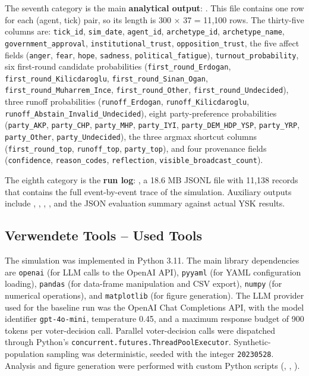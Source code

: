\documentclass[12pt,a4paper]{report}
\begin{document}
The seventh category is the main \textbf{analytical output}: . This file contains one row for each (agent, tick) pair, so its length is 300 $\times$ 37 = 11{,}100 rows. The thirty-five columns are: \texttt{tick\_id}, \texttt{sim\_date}, \texttt{agent\_id}, \texttt{archetype\_id}, \texttt{archetype\_name}, \texttt{government\_approval}, \texttt{institutional\_trust}, \texttt{opposition\_trust}, the five affect fields (\texttt{anger}, \texttt{fear}, \texttt{hope}, \texttt{sadness}, \texttt{political\_fatigue}), \texttt{turnout\_probability}, six first-round candidate probabilities (\texttt{first\_round\_Erdogan}, \texttt{first\_round\_Kilicdaroglu}, \texttt{first\_round\_Sinan\_Ogan}, \texttt{first\_round\_Muharrem\_Ince}, \texttt{first\_round\_Other}, \texttt{first\_round\_Undecided}), three runoff probabilities (\texttt{runoff\_Erdogan}, \texttt{runoff\_Kilicdaroglu}, \texttt{runoff\_Abstain\_Invalid\_Undecided}), eight party-preference probabilities (\texttt{party\_AKP}, \texttt{party\_CHP}, \texttt{party\_MHP}, \texttt{party\_IYI}, \texttt{party\_DEM\_HDP\_YSP}, \texttt{party\_YRP}, \texttt{party\_Other}, \texttt{party\_Undecided}), the three argmax shortcut columns (\texttt{first\_round\_top}, \texttt{runoff\_top}, \texttt{party\_top}), and four provenance fields (\texttt{confidence}, \texttt{reason\_codes}, \texttt{reflection}, \texttt{visible\_broadcast\_count}).

The eighth category is the \textbf{run log}: , a 18.6 MB JSONL file with 11{,}138 records that contains the full event-by-event trace of the simulation. Auxiliary outputs include , , , , and the JSON evaluation summary against actual YSK results.

\subsection{Verwendete Tools -- Used Tools}
\label{sec:tools}

The simulation was implemented in Python 3.11. The main library dependencies are \texttt{openai} (for LLM calls to the OpenAI API), \texttt{pyyaml} (for YAML configuration loading), \texttt{pandas} (for data-frame manipulation and CSV export), \texttt{numpy} (for numerical operations), and \texttt{matplotlib} (for figure generation). The LLM provider used for the baseline run was the OpenAI Chat Completions API, with the model identifier \texttt{gpt-4o-mini}, temperature 0.45, and a maximum response budget of 900 tokens per voter-decision call. Parallel voter-decision calls were dispatched through Python's \texttt{concurrent.futures.ThreadPoolExecutor}. Synthetic-population sampling was deterministic, seeded with the integer \texttt{20230528}. Analysis and figure generation were performed with custom Python scripts (, , ).
\end{document}

